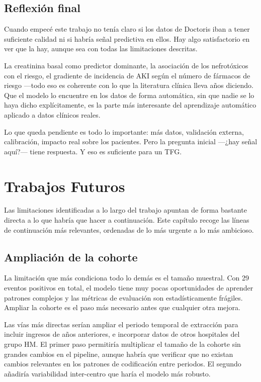 \documentclass[12pt, a4paper, oneside]{report}
\begin{document}
\section{Reflexión final}

Cuando empecé este trabajo no tenía claro si los datos de Doctoris iban a tener suficiente calidad ni si habría señal predictiva en ellos. Hay algo satisfactorio en ver que la hay, aunque sea con todas las limitaciones descritas.

La creatinina basal como predictor dominante, la asociación de los nefrotóxicos con el riesgo, el gradiente de incidencia de AKI según el número de fármacos de riesgo —todo eso es coherente con lo que la literatura clínica lleva años diciendo. Que el modelo lo encuentre en los datos de forma automática, sin que nadie se lo haya dicho explícitamente, es la parte más interesante del aprendizaje automático aplicado a datos clínicos reales.

Lo que queda pendiente es todo lo importante: más datos, validación externa, calibración, impacto real sobre los pacientes. Pero la pregunta inicial —¿hay señal aquí?— tiene respuesta. Y eso es suficiente para un TFG.

\chapter{Trabajos Futuros}
\label{chap:trabajos_futuros}

Las limitaciones identificadas a lo largo del trabajo apuntan de forma bastante directa a lo que habría que hacer a continuación. Este capítulo recoge las líneas de continuación más relevantes, ordenadas de lo más urgente a lo más ambicioso.

\section{Ampliación de la cohorte}

La limitación que más condiciona todo lo demás es el tamaño muestral. Con 29 eventos positivos en total, el modelo tiene muy pocas oportunidades de aprender patrones complejos y las métricas de evaluación son estadísticamente frágiles. Ampliar la cohorte es el paso más necesario antes que cualquier otra mejora.

Las vías más directas serían ampliar el periodo temporal de extracción para incluir ingresos de años anteriores, e incorporar datos de otros hospitales del grupo HM. El primer paso permitiría multiplicar el tamaño de la cohorte sin grandes cambios en el pipeline, aunque habría que verificar que no existan cambios relevantes en los patrones de codificación entre periodos. El segundo añadiría variabilidad inter-centro que haría el modelo más robusto.
\end{document}
